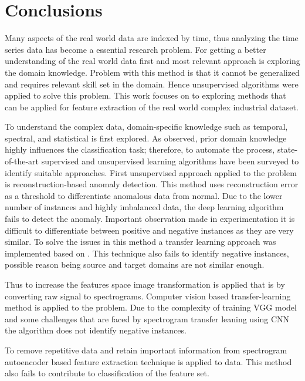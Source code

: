

    \chapter{Conclusions}
Many aspects of the real world data are indexed by time, thus analyzing the time series data has become a essential research problem. For getting a better understanding of the real world data first and most relevant approach is exploring the domain knowledge. Problem with this method is that it cannot be generalized and requires relevant skill set in the domain. Hence unsupervised algorithms were applied to solve this problem. This work focuses on to exploring methods that can be applied for feature extraction of the real world complex industrial dataset.

To understand the complex data, domain-specific knowledge such as temporal, spectral, and statistical is first explored. As observed, prior domain knowledge highly influences the classification task; therefore, to automate the process, state-of-the-art supervised and unsupervised learning algorithms have been surveyed to identify  suitable approaches. First unsupervised approach applied to the problem is reconstruction-based anomaly detection. This method uses reconstruction error as a threshold to differentiate anomalous data from normal. Due to the lower number of instances and highly imbalanced data, the deep learning algorithm fails to detect the anomaly. Important observation made in experimentation it is difficult to differentiate between positive and negative instances as they are very similar. 
To solve the issues in this method a transfer learning approach was implemented based on \cite{fawaz2018transfer}. This technique also fails to identify negative instances, possible reason being source and target domains are not similar enough.

Thus to increase the features space image transformation is applied that is by converting raw signal to spectrograms. Computer vision based transfer-learning method is applied to the problem. Due to the complexity of training VGG model and some challenges that are faced by spectrogram transfer leaning using CNN the algorithm does not identify negative instances.

To remove repetitive data and retain important information from spectrogram autoencoder based feature extraction technique is applied to data. This method also fails to contribute to classification of the feature set.

